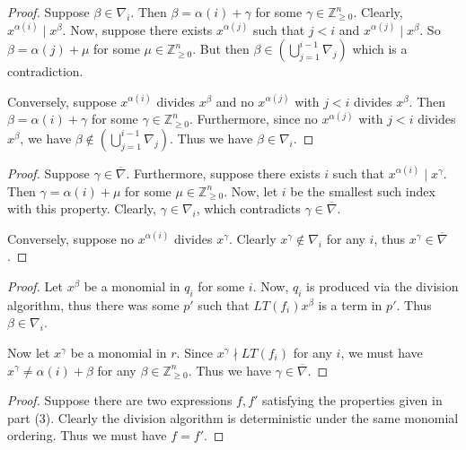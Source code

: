 \begin{proof}
    Suppose $\beta \in \nabla_i$.
    Then $\beta = \alpha(i) + \gamma$ for some $\gamma \in \mathbb{Z}_{\ge 0}^n$.
    Clearly, $x^{\alpha(i)} \mid x^\beta$.
    Now, suppose there exists $x^{\alpha(j)}$ such that $j < i$ and $x^{\alpha(j)} \mid x^\beta$.
    So $\beta = \alpha(j) + \mu$ for some $\mu \in \mathbb{Z}_{\ge 0}^n$.
    But then $\beta \in \left(\bigcup_{j = 1}^{i-1} \nabla_j\right)$ which is a contradiction.

    Conversely, suppose $x^{\alpha(i)}$ divides $x^\beta$ and no $x^{\alpha(j)}$ with $j < i$ divides $x^\beta$.
    Then $\beta = \alpha(i) + \gamma$ for some $\gamma \in \mathbb{Z}_{\ge 0}^n$.
    Furthermore, since no $x^{\alpha(j)}$ with $j < i$ divides $x^\beta$,
        we have $\beta \notin \left(\bigcup_{j = 1}^{i-1} \nabla_j\right)$.
    Thus we have $\beta \in \nabla_i$.
\end{proof}

\begin{proof}
    Suppose $\gamma \in \overline{\nabla}$.
    Furthermore, suppose there exists $i$ such that $x^{\alpha(i)} \mid x^\gamma$.
    Then $\gamma = \alpha(i) + \mu$ for some $\mu \in \mathbb{Z}_{\ge 0}^n$.
    Now, let $i$ be the smallest such index with this property.
    Clearly, $\gamma \in \nabla_i$, which contradicts $\gamma \in \overline{\nabla}$.

    Conversely, suppose no $x^{\alpha(i)}$ divides $x^\gamma$.
    Clearly $x^\gamma \notin \nabla_i$ for any $i$, thus 
        $x^\gamma \in \overline{\nabla}$.
\end{proof}

\begin{proof}
    Let $x^\beta$ be a monomial in $q_i$ for some $i$.
    Now, $q_i$ is produced via the division algorithm, thus 
        there was some $p'$ such that $LT(f_i) x^\beta$ is a term in $p'$.
    Thus $\beta \in \nabla_i$.

    Now let $x^\gamma$ be a monomial in $r$.
    Since $x^\gamma \nmid LT(f_i)$ for any $i$,
    we must have $x^\gamma \not= \alpha(i) + \beta$ for any $\beta \in \mathbb{Z}_{\ge 0}^n$.
    Thus we have $\gamma \in \overline{\nabla}$.
\end{proof}

\begin{proof}
    Suppose there are two expressions $f, f'$ satisfying
        the properties given in part (3).
    Clearly the division algorithm is deterministic under the same monomial ordering.
    Thus we must have $f = f'$.
\end{proof}


